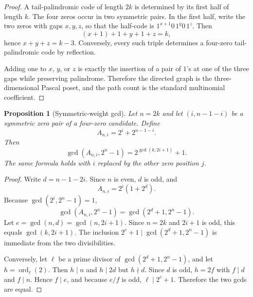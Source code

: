 \documentclass[11pt]{article}
\newtheorem{proposition}[theorem]{Proposition}
\theoremstyle{definition}
\theoremstyle{remark}
\begin{document}
\begin{proof}
A tail-palindromic code of length \(2k\) is determined by its first half of length \(k\). The four zeros occur in two symmetric pairs. In the first half, write the two zeros with gaps \(x,y,z\), so that the half-code is \(1^{x+1}0\,1^y0\,1^z\). Then
\[
(x+1)+1+y+1+z=k,
\]
hence \(x+y+z=k-3\). Conversely, every such triple determines a four-zero tail-palindromic code by reflection.

Adding one to \(x\), \(y\), or \(z\) is exactly the insertion of a pair of \(1\)'s at one of the three gaps while preserving palindrome. Therefore the directed graph is the three-dimensional Pascal poset, and the path count is the standard multinomial coefficient.
\end{proof}

\begin{proposition}[Symmetric-weight gcd]\label{prop:weight-gcd}
Let \(n=2k\) and let \((i,n-1-i)\) be a symmetric zero pair of a four-zero candidate. Define
\[
A_{n,i}=2^i+2^{n-1-i}.
\]
Then
\[
\boxed{
\gcd(A_{n,i},2^n-1)
=
2^{\gcd(k,2i+1)}+1.
}
\]
The same formula holds with \(i\) replaced by the other zero position \(j\).
\end{proposition}

\begin{proof}
Write \(d=n-1-2i\). Since \(n\) is even, \(d\) is odd, and
\[
A_{n,i}=2^i(1+2^d).
\]
Because \(\gcd(2^i,2^n-1)=1\),
\[
\gcd(A_{n,i},2^n-1)=\gcd(2^d+1,2^n-1).
\]
Let \(e=\gcd(n,d)=\gcd(n,2i+1)\). Since \(n=2k\) and \(2i+1\) is odd, this equals \(\gcd(k,2i+1)\). The inclusion \(2^e+1\mid\gcd(2^d+1,2^n-1)\) is immediate from the two divisibilities.

Conversely, let \(\ell\) be a prime divisor of \(\gcd(2^d+1,2^n-1)\), and let \(h=\operatorname{ord}_\ell(2)\). Then \(h\mid n\) and \(h\mid 2d\) but \(h\nmid d\). Since \(d\) is odd, \(h=2f\) with \(f\mid d\) and \(f\mid n\). Hence \(f\mid e\), and because \(e/f\) is odd, \(\ell\mid2^e+1\). Therefore the two gcds are equal.
\end{proof}
\end{document}
